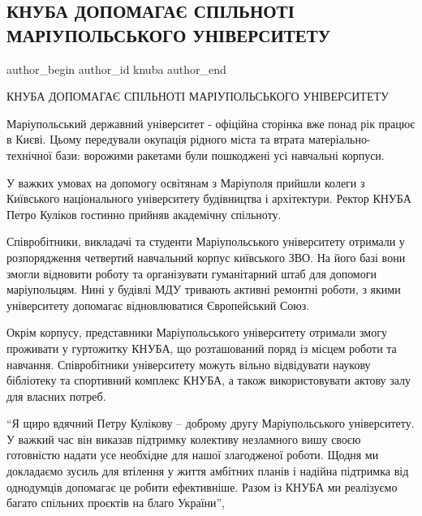  
 
 
 
 

\subsection{КНУБА ДОПОМАГАЄ СПІЛЬНОТІ МАРІУПОЛЬСЬКОГО УНІВЕРСИТЕТУ}
\label{sec:19_06_2023.fb.knuba.1.knuba_help_mariupol_univ}

\ifcmt
 author_begin
   author_id knuba
 author_end
\fi

КНУБА ДОПОМАГАЄ СПІЛЬНОТІ МАРІУПОЛЬСЬКОГО УНІВЕРСИТЕТУ

Маріупольський державний університет - офіційна сторінка вже понад рік працює в
Києві. Цьому передували окупація рідного міста та втрата матеріально-технічної
бази: ворожими ракетами були пошкоджені усі навчальні корпуси.

У важких умовах на допомогу освітянам з Маріуполя прийшли колеги з Київського
національного університету будівництва і архітектури. Ректор КНУБА Петро
Куліков гостинно прийняв академічну спільноту.

Співробітники, викладачі та студенти Маріупольського університету отримали у
розпорядження  четвертий  навчальний  корпус  київського ЗВО. На його базі вони
змогли відновити роботу та організувати гуманітарний штаб для допомоги
маріупольцям. Нині у будівлі МДУ тривають активні ремонтні роботи, з якими
університету допомагає відновлюватися Європейський Союз.

Окрім корпусу, представники Маріупольського університету отримали змогу
проживати у гуртожитку КНУБА, що розташований поряд із місцем роботи та
навчання. Співробітники університету можуть вільно відвідувати наукову
бібліотеку та спортивний комплекс КНУБА, а також  використовувати актову залу
для власних потреб.

\enquote{Я щиро вдячний Петру Кулікову – доброму другу Маріупольського університету.
У важкий час він виказав підтримку колективу незламного вишу своєю готовністю
надати усе необхідне для нашої злагодженої роботи. Щодня ми докладаємо зусиль
для втілення у життя амбітних планів і надійна підтримка від однодумців
допомагає це робити ефективніше. Разом із КНУБА ми реалізуємо багато спільних
проєктів на благо України},

